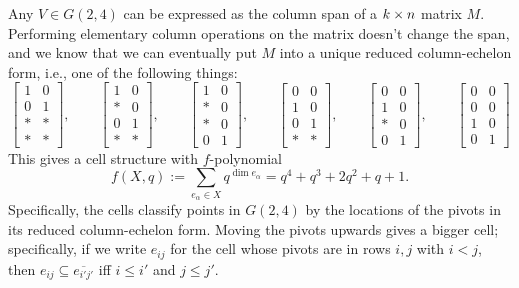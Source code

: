 Any $V\in G(2,4)$ can be expressed as the column span
of a $k\times n$ matrix $M$.  Performing elementary column operations
on the matrix doesn't change the span, and we know that
we can eventually put $M$ into a unique reduced column-echelon form,
i.e., one of the following things:
$$
\begin{bmatrix} 1 & 0\\ 0 & 1\\ * & *\\ * & *\end{bmatrix},\qquad
\begin{bmatrix} 1 & 0\\ * & 0\\ 0 & 1\\ * & *\end{bmatrix},\qquad
\begin{bmatrix} 1 & 0\\ * & 0\\ * & 0\\ 0 & 1\end{bmatrix},\qquad
\begin{bmatrix} 0 & 0\\ 1 & 0\\ 0 & 1\\ * & *\end{bmatrix},\qquad
\begin{bmatrix} 0 & 0\\ 1 & 0\\ * & 0\\ 0 & 1\end{bmatrix},\qquad
\begin{bmatrix} 0 & 0\\ 0 & 0\\ 1 & 0\\ 0 & 1\end{bmatrix}
$$
This gives a cell structure with $f$-polynomial
\[f(X,q) := \sum_{e_\alpha\in X} q^{\dim e_\alpha} = q^4+q^3+2q^2+q+1.\]
Specifically, the cells classify points in $G(2,4)$
by the locations of the pivots in its reduced column-echelon form.
Moving the pivots upwards gives a bigger cell; specifically,
if we write $e_{ij}$ for the cell whose pivots are in rows $i,j$ with $i<j$,
then $e_{ij}\subseteq\overline{e_{i'j'}}$ iff $i\leq i'$ and $j\leq j'$.


